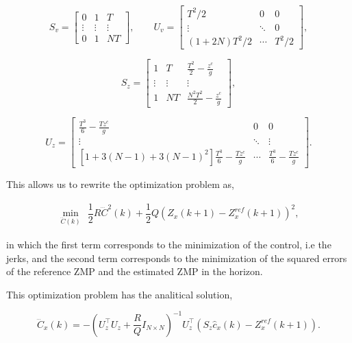 \begin{equation*}
  S_{v}=\begin{bmatrix} 0 & 1 & T \\ \vdots & \vdots & \vdots \\ 0 & 1 & NT \end{bmatrix}, \qquad
  U_{v}=\begin{bmatrix} T^2/2 & 0 & 0 \\ \vdots & \ddots & 0 \\ (1+2N)T^2/2 & \cdots & T^2/2 \end{bmatrix},
\end{equation*}

\begin{equation*}
  S_{z} = \begin{bmatrix} 1 & T & \frac{T^2}2-\frac{z^{c}}{g} \\ \vdots & \vdots & \vdots \\
                          1 & NT & \frac{N^2T^2}{2}-\frac{z^{c}}{g} \end{bmatrix},
\end{equation*}

\begin{equation*}
  U_{z} = \begin{bmatrix}
            \frac{T^3}{6}-\frac{Tz^{c}}{g} & 0 & 0 \\
          \vdots & \ddots & \vdots \\
          [1+3(N-1)+3(N-1)^2]\frac{T^3}{6}-\frac{Tz^{c}}{g} & \cdots & \frac{T^3}{6}-\frac{Tz^{c}}{g}
          \end{bmatrix}.
\end{equation*}

This allows us to rewrite the optimization problem as,

\begin{eqnarray}
\nonumber
\underset{\dddot{{C}}(k)}{\min} ~~ \dfrac{1}{2} R \dddot{{C}}^2(k) + \dfrac{1}{2} Q ({Z}_x(k+1) - {Z}^{ref}_x(k+1))^2,
\label{Eq:MinJerk}
\end{eqnarray}
 
in which the first term corresponds to the minimization of the control, i.e the jerks, and the second term corresponds to the minimization of the squared errors of the reference ZMP and the estimated ZMP in the horizon.

This optimization problem has the analitical solution,

\begin{equation}
\dddot{{C}}_x(k) = -({U}_z^{\top} {U}_z + \dfrac{R}{Q} {I}_{N \times N})^{-1} {U}_z^{\top}({S}_z \hat{c}_x(k) - {Z}_x^{ref}(k+1)).
\end{equation}

